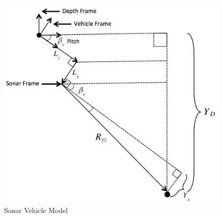 \documentclass[a4paper]{IEEEtran}
\begin{document}
\begin{figure}[h!]
  \centering
  \includegraphics[scale=0.4]{sonarvehframe}
  \captionsetup{justification=centering}
  \caption{Sonar Vehicle Model}
\end{figure}
\end{document}
